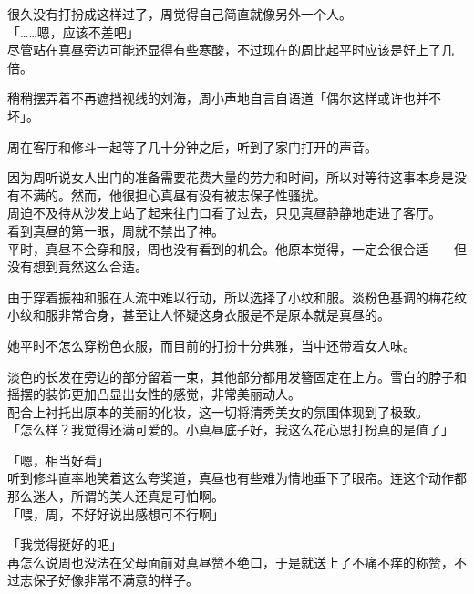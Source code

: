很久没有打扮成这样过了，周觉得自己简直就像另外一个人。\\

「……嗯，应该不差吧」\\

尽管站在真昼旁边可能还显得有些寒酸，不过现在的周比起平时应该是好上了几倍。

稍稍摆弄着不再遮挡视线的刘海，周小声地自言自语道「偶尔这样或许也并不坏」。\\

\vspace{2\baselineskip}

周在客厅和修斗一起等了几十分钟之后，听到了家门打开的声音。

因为周听说女人出门的准备需要花费大量的劳力和时间，所以对等待这事本身是没有不满的。然而，他很担心真昼有没有被志保子性骚扰。\\

周迫不及待从沙发上站了起来往门口看了过去，只见真昼静静地走进了客厅。\\

看到真昼的第一眼，周就不禁出了神。\\

平时，真昼不会穿和服，周也没有看到的机会。他原本觉得，一定会很合适——但没有想到竟然这么合适。

由于穿着振袖和服在人流中难以行动，所以选择了小纹和服。淡粉色基调的梅花纹小纹和服非常合身，甚至让人怀疑这身衣服是不是原本就是真昼的。

她平时不怎么穿粉色衣服，而目前的打扮十分典雅，当中还带着女人味。

淡色的长发在旁边的部分留着一束，其他部分都用发簪固定在上方。雪白的脖子和摇摆的装饰更加凸显出女性的感觉，非常美丽动人。\\

配合上衬托出原本的美丽的化妆，这一切将清秀美女的氛围体现到了极致。\\

「怎么样？我觉得还满可爱的。小真昼底子好，我这么花心思打扮真的是值了」

「嗯，相当好看」\\

听到修斗直率地笑着这么夸奖道，真昼也有些难为情地垂下了眼帘。连这个动作都那么迷人，所谓的美人还真是可怕啊。\\

「喂，周，不好好说出感想可不行啊」

「我觉得挺好的吧」\\

再怎么说周也没法在父母面前对真昼赞不绝口，于是就送上了不痛不痒的称赞，不过志保子好像非常不满意的样子。\\

